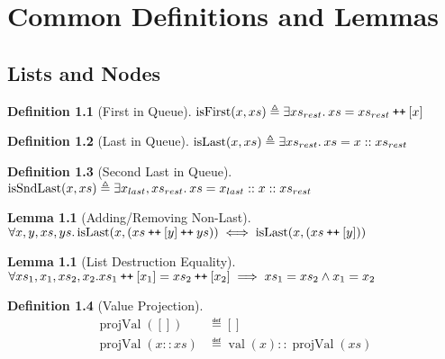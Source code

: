 \documentclass[a4paper, 10pt]{report}
\theoremstyle{definition}
\newtheorem{lemma}[theorem]{Lemma}
\newtheorem{definition}{Definition}[section]
\newcommand{\projval}{\operatorname{projVal}}
\newcommand{\isFirst}{\operatorname{isFirst}}
\newcommand{\isLast}{\operatorname{isLast}}
\newcommand{\isSndLast}{\operatorname{isSndLast}}
\newcommand{\nVal}[1]{\operatorname{val}(#1)}
\newcommand\catenate{\mathbin{\text{\ttfamily\upshape ++}}}
\begin{document}

\cleardoublepage
\appendix
\chapter{Common Definitions and Lemmas}\label{ch:appendix:common}

\section{Lists and Nodes}
\label{appendix:common:section:ListsNodes}

\begin{definition}[First in Queue]\label{COMMON:Def:first-q}
  $\isFirst(x, xs) \eqdef \Exists xs_{rest} . xs = xs_{rest} \catenate [x]$
\end{definition}

\begin{definition}[Last in Queue]\label{COMMON:Def:last-q}
  $\isLast(x, xs) \eqdef \Exists xs_{rest} . xs = x :: xs_{rest}$
\end{definition}

\begin{definition}[Second Last in Queue]\label{COMMON:Def:sndlast-q}
  $\isSndLast(x, xs) \eqdef \Exists x_{last}, xs_{rest} . xs = x_{last} :: x :: xs_{rest}$
\end{definition}

\begin{lemma}[Adding/Removing Non-Last]\label{lemma:isLast-remove}
  $\All x, y, xs, ys.\\
  \isLast(x, (xs \catenate [y] \catenate ys)) \iff \isLast(x, (xs \catenate [y]))$
\end{lemma}

\begin{lemma}[List Destruction Equality]\label{lemma:list-last-eq}
  $\All xs_1, x_1, xs_2, x_2.\\
  xs_1 \catenate [x_1] = xs_2 \catenate [x_2] \implies xs_1 = xs_2 \land{} x_1 = x_2$
\end{lemma}

\begin{definition}[Value Projection]\label{COMMON:Def:val-proj}
  \begin{align*}
    \projval([]) &\eqdef []\\
    \projval(x :: xs) &\eqdef \nVal{x} :: \projval(xs)
  \end{align*}
\end{definition}
\end{document}
